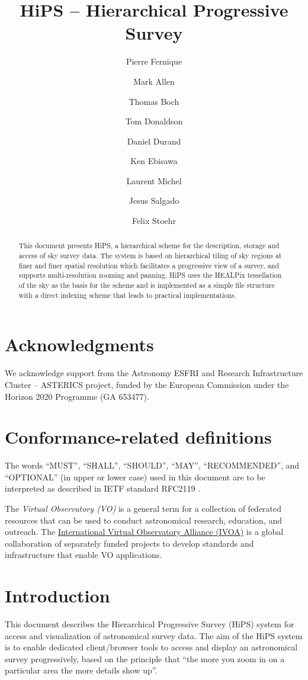 \documentclass[11pt,a4paper]{ivoa}
\title{HiPS -- Hierarchical Progressive Survey}
\author[http://www.ivoa.net]{Pierre Fernique}
\author{Mark Allen}
\author{Thomas Boch}
\author{Tom Donaldson}
\author{Daniel Durand}
\author{Ken Ebisawa}
\author{Laurent Michel}
\author{Jesus Salgado}
\author{Felix Stoehr}
\begin{document}
\begin{abstract}
This document presents HiPS, a hierarchical scheme for the description, storage and access of sky survey data. The system is based on hierarchical tiling of sky regions at finer and finer spatial resolution which facilitates a progressive view of a survey, and supports multi-resolution zooming and panning. HiPS uses the HEALPix tessellation of the sky as the basis for the scheme and is implemented as a simple file structure with a direct indexing scheme that leads to practical implementations.
\end{abstract}


\section*{Acknowledgments}

We acknowledge support from the Astronomy ESFRI and Research Infrastructure Cluster -- ASTERICS project, funded by the European Commission under the Horizon 2020 Programme (GA 653477).

\section*{Conformance-related definitions}

The words ``MUST'', ``SHALL'', ``SHOULD'', ``MAY'', ``RECOMMENDED'', and
``OPTIONAL'' (in upper or lower case) used in this document are to be
interpreted as described in IETF standard RFC2119 \citep{std:RFC2119}.

The \emph{Virtual Observatory (VO)} is a
general term for a collection of federated resources that can be used
to conduct astronomical research, education, and outreach.
The \href{https://www.ivoa.net}{International
Virtual Observatory Alliance (IVOA)} is a global
collaboration of separately funded projects to develop standards and
infrastructure that enable VO applications.


\section{Introduction}

This document describes the Hierarchical Progressive Survey (HiPS) system for access and visualization of astronomical survey data. The aim of the HiPS system is to enable dedicated client/browser tools to access and display an astronomical survey progressively, based on the principle that ``the more you zoom in on a particular area the more details show up''. 
\end{document}

